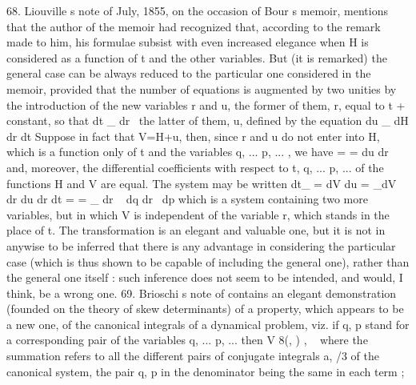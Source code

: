 \documentclass[11pt,a4paper]{book}
\begin{document}

68.
Liouville s
note
of
July,
1855,
on
the
occasion
of
Bour s
memoir,
mentions
that
the
author
of
the memoir
had
recognized
that, according
to
the remark made
to
him,
his
formulae
subsist
with
even
increased
elegance when H
is
considered
as
a
function
of
t
and
the
other
variables.
But
(it
is
remarked)
the
general
case
can
be
always
reduced
to
the
particular
one
considered
in
the
memoir,
provided
that
the
number
of
equations
is
augmented
by
two
unities
by
the
introduction
of
the
new
variables r and
u, the former
of them,
r, equal
to
t + constant,
so that
dt _
dr~
the
latter
of them,
u, defined by the
equation
du _
dH
dr
dt
Suppose in
fact that
V=H+u,
then,
since
r
and
u
do
not
enter
into
H,
which
is
a
function
only
of
t
and
the
variables
q,
... p,
...
, we have
=
=
du
dr
and, moreover, the
differential
coefficients with
respect
to
t,
q,
... p,
...
of
the
functions
H and V are
equal.
The system may be written
dt_ = dV
du = _dV
dr
du
dr
dt
=
= _
dr ~
dq
dr~
dp
which
is
a
system
containing
two more
variables,
but
in which V
is
independent
of
the
variable
r, which
stands
in
the
place
of
t.
The
transformation
is
an
elegant and
valuable
one, but
it
is
not
in anywise
to
be
inferred
that
there
is
any
advantage
in
considering
the
particular
case
(which
is
thus
shown
to
be
capable
of
including
the
general
one),
rather
than
the
general
one
itself
:
such
inference
does
not
seem
to be
intended, and would,
I
think, be a wrong
one.
69.
Brioschi s
note
of
contains
an
elegant
demonstration
(founded
on
the
theory
of skew
determinants)
of
a
property,
which
appears
to
be
a new
one,
of
the
canonical
integrals
of a
dynamical
problem,
viz.
if
q, p
stand
for
a
corresponding pair
of the
variables
q,
...
p,
... then
V 8(,
)
,
~
where
the
summation
refers
to
all
the
different
pairs
of
conjugate
integrals
a,
/3
of
the
canonical
system,
the
pair
q, p
in
the denominator
being
the
same
in each term
;

\end{document}
